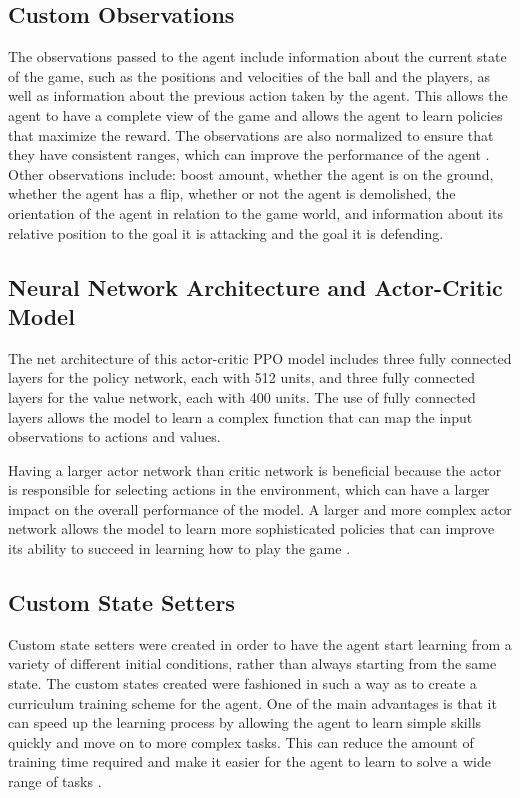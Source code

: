 \documentclass[10pt,twocolumn]{article}
\begin{document}
\subsection{Custom Observations}
 The observations passed to the agent include information about the current state of the game, such as the positions and velocities of the ball and the players, as well as information about the previous action taken by the agent. This allows the agent to have a complete view of the game and allows the agent to learn policies that maximize the reward. The observations are also normalized to ensure that they have consistent ranges, which can improve the performance of the agent \cite{brummerloh_2021}. Other observations include: boost amount, whether the agent is on the ground, whether the agent has a flip, whether or not the agent is demolished, the orientation of the agent in relation to the game world, and information about its relative position to the goal it is attacking and the goal it is defending.

\subsection{Neural Network Architecture and Actor-Critic Model}
 The net architecture of this actor-critic PPO model includes 
 three fully connected layers for the policy network, each 
 with 512 units, and three fully connected layers for the 
 value network, each with 400 units. The use of fully 
 connected layers allows the model to learn a complex 
 function that can map the input observations to actions and 
 values.

 Having a larger actor network than critic network is 
 beneficial because the actor is responsible for selecting 
 actions in the environment, which can have a larger impact 
 on the overall performance of the model. A larger and more 
 complex actor network allows the model to learn more 
 sophisticated policies that can improve its ability to 
 succeed in learning how to play the game \cite{neal2019in}.

\subsection{Custom State Setters}
 Custom state setters were created in order to have the agent start learning from a variety of different initial conditions, rather than always starting from the same state. The custom states created were fashioned in such a way as to create a curriculum training scheme for the agent. One of the main advantages is that it can speed up the learning process by allowing the agent to learn simple skills quickly and move on to more complex tasks. This can reduce the amount of training time required and make it easier for the agent to learn to solve a wide range of tasks \cite{https://doi.org/10.48550/arxiv.2003.04960}.
 
\end{document}
